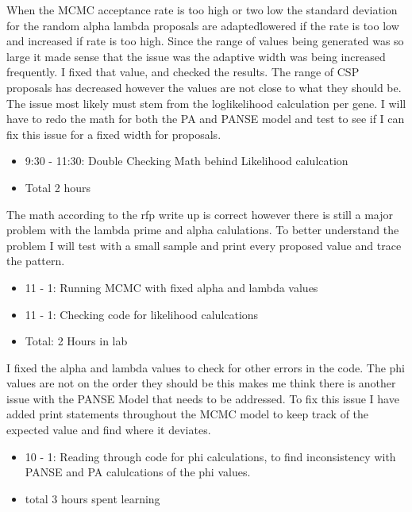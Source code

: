 \documentclass[12pt,hyperref]{labbook}
\begin{document}
When the MCMC acceptance rate is too high or two low the standard deviation for the random alpha lambda proposals are adapted\.
lowered if the rate is too low and increased if rate is too high. Since the range of values being generated was so large it made sense that
the issue was the adaptive width was being increased frequently. I fixed that value, and checked the results. The range of CSP proposals has
decreased however the values are not close to what they should be. The issue most likely must stem from the loglikelihood calculation 
per gene.
I will have to redo the math for both the PA and PANSE model and test to see if I can fix this issue for a fixed width for proposals.
\begin{itemize}
    \item 9:30 - 11:30: Double Checking Math behind Likelihood calulcation
    \item Total 2 hours
\end{itemize}
The math according to the rfp write up is correct however there is still a major problem with the lambda prime and alpha calulations.
To better understand the problem I will test with a small sample and print every proposed value and trace the pattern.
\begin{itemize}
    \item 11 - 1: Running MCMC with fixed alpha and lambda values
    \item 11 - 1: Checking code for likelihood calulcations
    \item Total: 2 Hours in lab
\end{itemize}
I fixed the alpha and lambda values to check for other errors in the code.
The phi values are not on the order they should be this makes me think there is another issue with the PANSE Model that needs to be addressed.
To fix this issue I have added print statements throughout the MCMC model to keep track of the expected value and find where it deviates.
\begin{itemize}
    \item 10 - 1: Reading through code for phi calculations, to find inconsistency with PANSE and PA calulcations of the phi values.
    \item total 3 hours spent learning
\end{itemize}
\end{document}
